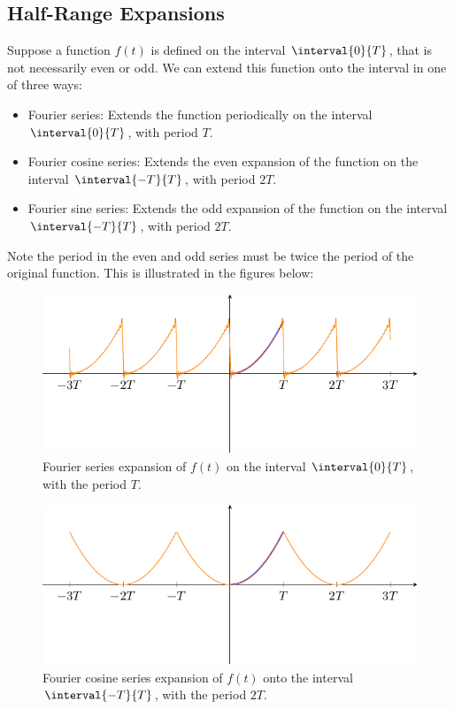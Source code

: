 \documentclass{article}
\begin{document}
\subsection{Half-Range Expansions}
Suppose a function \(f\left( t \right)\) is defined on the interval
\(\interval{0}{T}\), that is not necessarily even or odd. We can extend
this function onto the interval in one of three ways:
\begin{itemize}
    \item Fourier series: Extends the function periodically on the
          interval \(\interval{0}{T}\), with period \(T\).
    \item Fourier cosine series: Extends the even expansion of the
          function on the interval \(\interval{-T}{T}\), with period
          \(2T\).
    \item Fourier sine series: Extends the odd expansion of the
          function on the interval \(\interval{-T}{T}\), with period
          \(2T\).
\end{itemize}
Note the period in the even and odd series must be twice the period of
the original function. This is illustrated in the figures below:
\begin{figure}[H]
    \centering
    \includegraphics[width = 0.8\linewidth]{figures/half_range_expansion_Fourier.pdf}
    \caption{Fourier series expansion of \(f\left( t \right)\) on the interval \(\interval{0}{T}\), with the period \(T\).} %
\end{figure}
\begin{figure}[H]
    \centering
    \includegraphics[width = 0.8\linewidth]{figures/half_range_expansion_Cosine.pdf}
    \caption{Fourier cosine series expansion of \(f\left( t \right)\) onto the interval \(\interval{-T}{T}\), with the period \(2T\).} %
\end{figure}
\end{document}
